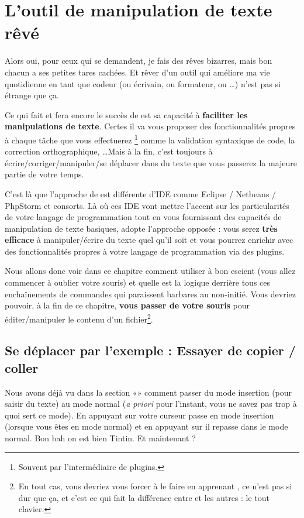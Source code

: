 \chapter{L'outil de manipulation de texte rêvé}

Alors oui, pour ceux qui se demandent, je fais des rêves bizarres, mais bon chacun a ses petites tares cachées. Et rêver d'un outil qui améliore ma vie quotidienne en tant que codeur (ou écrivain, ou formateur, ou \ldots) n'est pas si étrange que ça.

Ce qui fait et fera encore le succès de \vim est sa capacité à \textbf{faciliter les manipulations de texte}. Certes il va vous proposer des fonctionnalités propres à chaque tâche que vous effectuerez \footnote{Souvent par l'intermédiaire de plugins.} comme la validation syntaxique de code, la correction orthographique, \ldots Mais à la fin, c'est toujours à écrire/corriger/manipuler/se déplacer dans du texte que vous passerez la majeure partie de votre temps. 

C'est là que l'approche de \vim est différente d'IDE comme Eclipse / Netbeans / PhpStorm et consorts. Là où ces IDE vont mettre l'accent sur les particularités de votre langage de programmation tout en vous fournissant des capacités de manipulation de texte basiques, \vim adopte l'approche opposée : vous serez \textbf{très efficace} à manipuler/écrire du texte quel qu'il soit et vous pourrez enrichir \vim avec des fonctionnalités propres à votre langage de programmation via des plugins.

Nous allons donc voir dans ce chapitre comment utiliser \vim à bon escient (vous allez commencer à oublier votre souris) et quelle est la logique derrière tous ces enchaînements de commandes qui paraissent barbares au non-initié. Vous devriez pouvoir, à la fin de ce chapitre, \textbf{vous passer de votre souris} pour éditer/manipuler le contenu d'un fichier\footnote{En tout cas, vous devriez vous forcer à le faire en apprenant \vim, ce n'est pas si dur que ça, et c'est ce qui fait la différence entre \vim et les autres : le tout clavier.}.

\section{Se déplacer par l'exemple : Essayer de copier / coller}\label{sec:se-deplacer}


Nous avons déjà vu dans la section «» comment passer du mode insertion (pour saisir du texte) au mode normal (\emph{a priori} pour l'instant, vous ne savez pas trop à quoi sert ce mode). En appuyant sur \tti votre curseur passe en mode insertion (lorsque vous êtes en mode normal) et en appuyant sur \ttesc il repasse dans le mode normal. Bon bah on est bien Tintin. Et maintenant ? 

